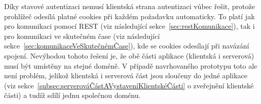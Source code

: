 Díky stavové autentizaci nemusí klientská strana autentizaci vůbec řešit, protože prohlížeč odesílá platné cookies při každém požadavku automaticky.
To platí jak pro komunikaci pomocí \gls{REST} (viz následující sekce~\ref{sec:restKomunikace}), tak i pro komunikaci ve skutečném čase (viz následující sekce~\ref{sec:komunikaceVeSkutečnémČase}), kde se cookies odesílají při navázání spojení.
Nevýhodou tohoto řešení je, že obě části aplikace (klientská i serverová) musí být umístěny na stejné doméně.
V případě navrhovaného prototypu toto ale není problém, jelikož klientská i serverová část jsou sloučeny do jedné aplikace (viz sekce~\ref{subsec:serverováČástAVystaveníKlientskéČásti} o zveřejnění klientské části) a tudíž sdílí jednu společnou doménu.
